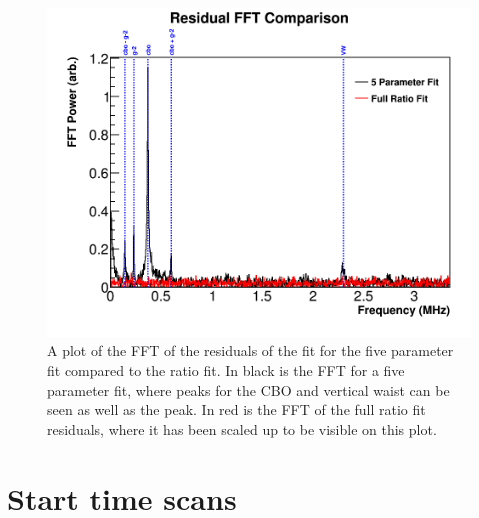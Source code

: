 \begin{figure}[]
	\centering
	\includegraphics[width=\textwidth]{FFTComparison_RatioCBO}
    \caption[FFTComparison_RatioCBO]{A plot of the FFT of the residuals of the fit for the five parameter fit compared to the ratio fit. In black is the FFT for a five parameter fit, where peaks for the CBO and vertical waist can be seen as well as the \gmtwo peak. In red is the FFT of the full ratio fit residuals, where it has been scaled up to be visible on this plot.}
    \label{fig:FFTComparison_RatioCBO}
\end{figure}


\section{Start time scans}

